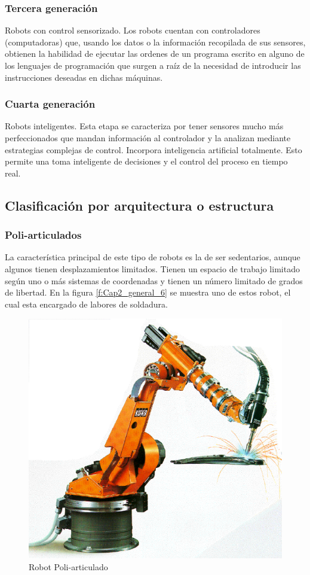         \subsubsection{Tercera generación}
            Robots con control sensorizado. Los robots cuentan con controladores (computadoras) que, usando los datos o la información recopilada de sus sensores, obtienen la habilidad de ejecutar las ordenes de un programa escrito en alguno de los lenguajes de programación que surgen a raíz de la necesidad de introducir las instrucciones deseadas en dichas máquinas. 
        \subsubsection{Cuarta generación}
            Robots inteligentes. Esta etapa se caracteriza por tener sensores mucho más perfeccionados que mandan información al controlador y la analizan mediante estrategias complejas de control. Incorpora inteligencia artificial totalmente. Esto permite una toma inteligente de decisiones y el control del proceso en tiempo real.

        \newpage
        
    \subsection{Clasificación por arquitectura o estructura}
        
        \subsubsection{Poli-articulados}
        La característica principal de este tipo de robots es la de ser sedentarios, aunque algunos tienen desplazamientos limitados. Tienen un espacio de trabajo limitado según uno o más sistemas de coordenadas y tienen un número limitado de grados de libertad. En la figura \eqref{f:Cap2_general_6} se muestra uno de estos robot, el cual esta encargado de labores de soldadura.
        
        \begin{figure}[htb]
            \centering
            \includegraphics[width=0.35\linewidth]{Main/Chapter2/Images2/Robot-poliarticulado.png}
            \caption{Robot Poli-articulado \cite{ER4pc}}
            \label{f:Cap2_general_6}
        \end{figure}
        
